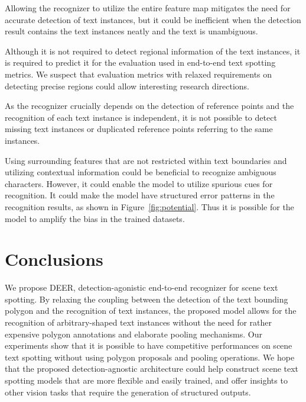 \documentclass[10pt,twocolumn,letterpaper]{article}
\newcommand{\Figure}[1]{Figure~\ref{fig:#1}}
\newcommand{\methodname}[0]{DEER}
\begin{document}
Allowing the recognizer to utilize the entire feature map mitigates the need for accurate detection of text instances, but it could be inefficient when the detection result contains the text instances neatly and the text is unambiguous.

Although it is not required to detect regional information of the text instances, it is required to predict it for the evaluation used in end-to-end text spotting metrics. We suspect that evaluation metrics with relaxed requirements on detecting precise regions could allow interesting research directions.

As the recognizer crucially depends on the detection of reference points and the recognition of each text instance is independent, it is not possible to detect missing text instances or duplicated reference points referring to the same instances.

Using surrounding features that are not restricted within text boundaries and utilizing contextual information could be beneficial to recognize ambiguous characters. However, it could enable the model to utilize spurious cues for recognition. It could make the model have structured error patterns in the recognition results, as shown in \Figure{potential}. Thus it is possible for the model to amplify the bias in the trained datasets. 
\section{Conclusions}
We propose \methodname, detection-agonistic end-to-end recognizer for scene text spotting. By relaxing the coupling between the detection of the text bounding polygon and the recognition of text instances, the proposed model allows for the recognition of arbitrary-shaped text instances without the need for rather expensive polygon annotations and elaborate pooling mechanisms. Our experiments show that it is possible to have competitive performances on scene text spotting without using polygon proposals and pooling operations. We hope that the proposed detection-agnostic architecture could help construct scene text spotting models that are more flexible and easily trained, and offer insights to other vision tasks that require the generation of structured outputs.

 
{\small


}
\end{document}
